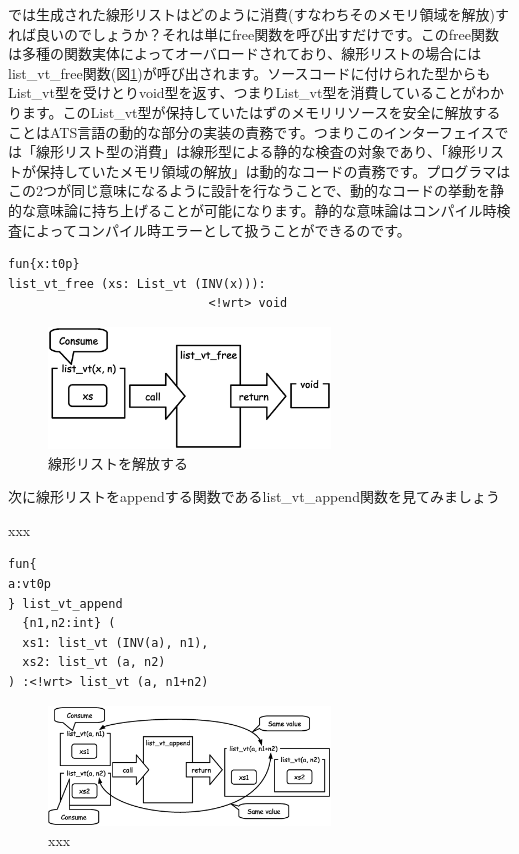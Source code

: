 \documentclass{ipsjprosym}
\begin{document}
では生成された線形リストはどのように消費(すなわちそのメモリ領域を解放)すれば良いのでしょうか？それは単にfree関数を呼び出すだけです。このfree関数は多種の関数実体によってオーバロードされており、線形リストの場合にはlist\_vt\_free関数(図\ref{fig:list_vt_free})が呼び出されます。ソースコードに付けられた型からもList\_vt型を受けとりvoid型を返す、つまりList\_vt型を消費していることがわかります。このList\_vt型が保持していたはずのメモリリソースを安全に解放することはATS言語の動的な部分の実装の責務です。つまりこのインターフェイスでは「線形リスト型の消費」は線形型による静的な検査の対象であり、「線形リストが保持していたメモリ領域の解放」は動的なコードの責務です。プログラマはこの2つが同じ意味になるように設計を行なうことで、動的なコードの挙動を静的な意味論に持ち上げることが可能になります。静的な意味論はコンパイル時検査によってコンパイル時エラーとして扱うことができるのです。

\vspace{3mm}
\begin{verbatim}
fun{x:t0p}
list_vt_free (xs: List_vt (INV(x))):
                            <!wrt> void
\end{verbatim}
\vspace{3mm}

\begin{figure}[h]
\centering
\includegraphics[width=75mm]{draw/list_vt_free.eps}
\caption{線形リストを解放する}
\label{fig:list_vt_free}
\end{figure}


次に線形リストをappendする関数であるlist\_vt\_append関数を見てみましょう

xxx

\vspace{3mm}
\begin{verbatim}
fun{
a:vt0p
} list_vt_append
  {n1,n2:int} (
  xs1: list_vt (INV(a), n1),
  xs2: list_vt (a, n2)
) :<!wrt> list_vt (a, n1+n2)
\end{verbatim}
\vspace{3mm}


\begin{figure}[h]
\centering
\includegraphics[width=75mm]{draw/list_vt_append.eps}
\caption{xxx}
\label{fig:list_vt_append}
\end{figure}
\end{document}
